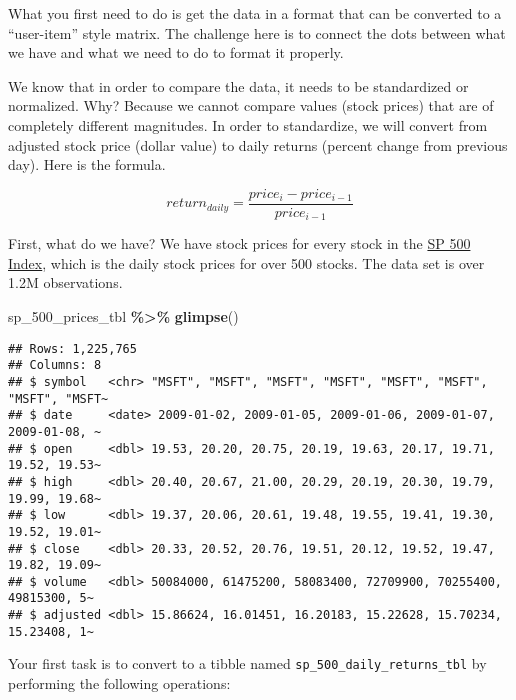 \documentclass[
]{article}
\newenvironment{Shaded}{\begin{snugshade}}{\end{snugshade}}
\newcommand{\FunctionTok}[1]{\textcolor[rgb]{0.13,0.29,0.53}{\textbf{#1}}}
\newcommand{\NormalTok}[1]{#1}
\newcommand{\SpecialCharTok}[1]{\textcolor[rgb]{0.81,0.36,0.00}{\textbf{#1}}}
\begin{document}
What you first need to do is get the data in a format that can be
converted to a ``user-item'' style matrix. The challenge here is to
connect the dots between what we have and what we need to do to format
it properly.

We know that in order to compare the data, it needs to be standardized
or normalized. Why? Because we cannot compare values (stock prices) that
are of completely different magnitudes. In order to standardize, we will
convert from adjusted stock price (dollar value) to daily returns
(percent change from previous day). Here is the formula.

\[ 
return_{daily} = \frac{price_{i}-price_{i-1}}{price_{i-1}}
\]

First, what do we have? We have stock prices for every stock in the
\href{https://finance.yahoo.com/quote/\%5EGSPC?p=\%5EGSPC}{SP 500
Index}, which is the daily stock prices for over 500 stocks. The data
set is over 1.2M observations.

\begin{Shaded}
\begin{Highlighting}[]
\NormalTok{sp\_500\_prices\_tbl }\SpecialCharTok{\%\textgreater{}\%} \FunctionTok{glimpse}\NormalTok{()}
\end{Highlighting}
\end{Shaded}

\begin{verbatim}
## Rows: 1,225,765
## Columns: 8
## $ symbol   <chr> "MSFT", "MSFT", "MSFT", "MSFT", "MSFT", "MSFT", "MSFT", "MSFT~
## $ date     <date> 2009-01-02, 2009-01-05, 2009-01-06, 2009-01-07, 2009-01-08, ~
## $ open     <dbl> 19.53, 20.20, 20.75, 20.19, 19.63, 20.17, 19.71, 19.52, 19.53~
## $ high     <dbl> 20.40, 20.67, 21.00, 20.29, 20.19, 20.30, 19.79, 19.99, 19.68~
## $ low      <dbl> 19.37, 20.06, 20.61, 19.48, 19.55, 19.41, 19.30, 19.52, 19.01~
## $ close    <dbl> 20.33, 20.52, 20.76, 19.51, 20.12, 19.52, 19.47, 19.82, 19.09~
## $ volume   <dbl> 50084000, 61475200, 58083400, 72709900, 70255400, 49815300, 5~
## $ adjusted <dbl> 15.86624, 16.01451, 16.20183, 15.22628, 15.70234, 15.23408, 1~
\end{verbatim}

Your first task is to convert to a tibble named
\texttt{sp\_500\_daily\_returns\_tbl} by performing the following
operations:
\end{document}
